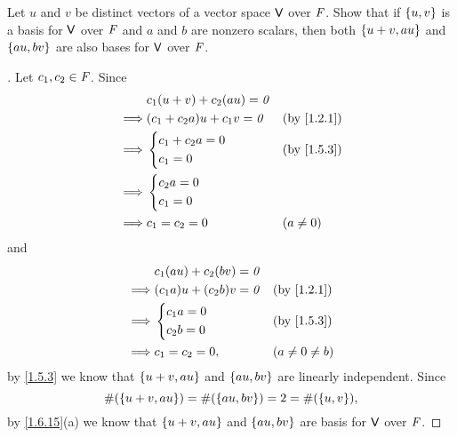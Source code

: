 \exercisesection

\setcounter{ex}{10}
\begin{ex}\label{ex:1.6.11}
  Let \(u\) and \(v\) be distinct vectors of a vector space \(\mathsf{V}\) over \(\mathit{F}\).
  Show that if \(\left\lbrace u, v\right\rbrace\) is a basis for \(\mathsf{V}\) over \(\mathit{F}\) and \(a\) and \(b\) are nonzero scalars, then both \(\left\lbrace u + v, au\right\rbrace\) and \(\left\lbrace au, bv\right\rbrace\) are also bases for \(\mathsf{V}\) over \(\mathit{F}\).
\end{ex}

\begin{proof}[]
  Let \(c_1, c_2 \in \mathit{F}\).
  Since
  \begin{align*}
             & c_1 (u + v) + c_2 (au) = \zv                  \\
    \implies & (c_1 + c_2 a) u + c_1 v = \zv &  & \by{1.2.1} \\
    \implies & \begin{dcases}
                 c_1 + c_2 a = 0 \\
                 c_1 = 0
               \end{dcases}            &  & \by{1.5.3}       \\
    \implies & \begin{dcases}
                 c_2 a = 0 \\
                 c_1 = 0
               \end{dcases}                                 \\
    \implies & c_1 = c_2 = 0                 &  & (a \neq 0)
  \end{align*}
  and
  \begin{align*}
             & c_1 (au) + c_2 (bv) = \zv                          \\
    \implies & (c_1 a) u + (c_2 b) v = \zv &  & \by{1.2.1}        \\
    \implies & \begin{dcases}
                 c_1 a = 0 \\
                 c_2 b = 0
               \end{dcases}              &  & \by{1.5.3}          \\
    \implies & c_1 = c_2 = 0,              &  & (a \neq 0 \neq b)
  \end{align*}
  by \cref{1.5.3} we know that \(\left\lbrace u + v, au\right\rbrace\) and \(\left\lbrace au, bv\right\rbrace\) are linearly independent.
  Since
  \[
    \#(\left\lbrace u + v, au\right\rbrace) = \#(\left\lbrace au, bv\right\rbrace) = 2 = \#(\left\lbrace u, v\right\rbrace),
  \]
  by \cref{1.6.15}(a) we know that \(\left\lbrace u + v, au\right\rbrace\) and \(\left\lbrace au, bv\right\rbrace\) are basis for \(\mathsf{V}\) over \(\mathit{F}\).
\end{proof}

